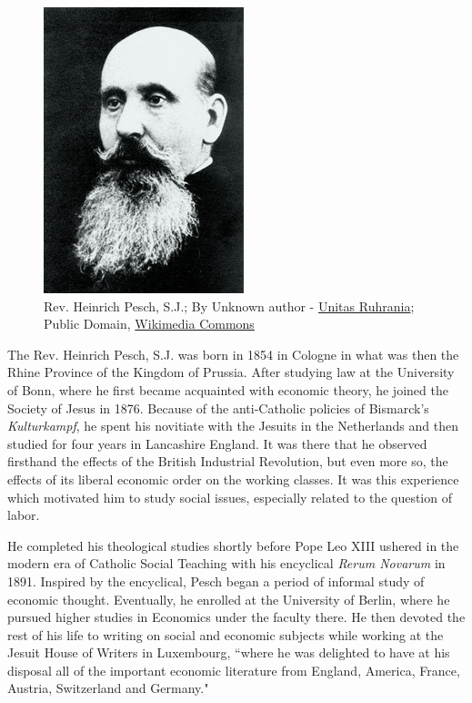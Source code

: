 \documentclass{article}
\begin{document}
\begin{figure}
    \centering
    \includegraphics{Heinrich_Pesch.jpg}
    \caption{Rev. Heinrich Pesch, S.J.;
        By Unknown author - \href{http://www.unitas-ruhrania.org/index.php?section=news&amp;cmd=details&amp;newsid=1170}{Unitas Ruhrania}; Public Domain, \href{https://commons.wikimedia.org/w/index.php?curid=25140631}{Wikimedia Commons}
    }
    \label{fig:peschphoto}
\end{figure}

The Rev. Heinrich Pesch, S.J. was born in 1854 in Cologne in what was then the Rhine Province of the Kingdom of Prussia.  After studying law at the University of Bonn, where he first became acquainted with economic theory, he joined the Society of Jesus in 1876.  Because of the anti-Catholic policies of Bismarck’s \emph{Kulturkampf}, he spent his novitiate with the Jesuits in the Netherlands and then studied for four years in Lancashire England.  It was there that he observed firsthand the effects of the British Industrial Revolution, but even more so, the effects of its liberal economic order on the working classes.  It was this experience which motivated him to study social issues, especially related to the question of labor.\citep{schuyler1953}\medskip

He completed his theological studies shortly before Pope Leo XIII ushered in the modern era of Catholic Social Teaching with his encyclical \emph{Rerum Novarum} in 1891.  Inspired by the encyclical, Pesch began a period of informal study of economic thought.  Eventually, he enrolled at the University of Berlin, where he pursued higher studies in Economics under the faculty there.  He then devoted the rest of his life to writing on social and economic subjects while working at the Jesuit House of Writers in Luxembourg, ``where he was delighted to have at his disposal all of the important economic literature from England, America, France, Austria, Switzerland and Germany." \citep[p. 3]{mulcahy1952}\medskip
\end{document}
